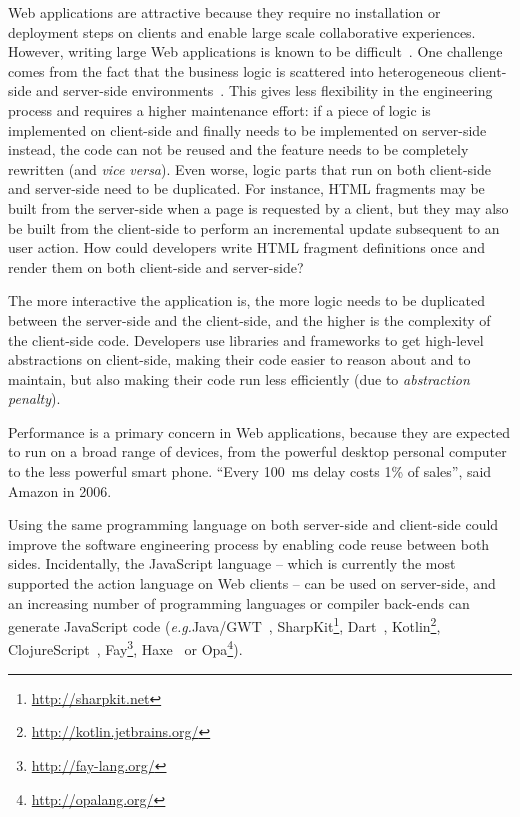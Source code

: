\documentclass[preprint]{sigplanconf}
\newcommand{\eg}{\emph{e.g.}}
\begin{document}
Web applications are attractive because they require no installation or deployment steps on clients and enable large
scale collaborative experiences. However, writing large Web applications is known to be
difficult~\cite{Mikkonen08_SpaghettiJs,Preciado05_RIAMethodologyNecessity}. One challenge comes from the fact
that the business logic is scattered into heterogeneous client-side and server-side
environments~\cite{Echeverria09_RIA,Kuuskeri09_PartitioningClientServer}. This gives less flexibility in the
engineering process and requires a higher maintenance effort: if a piece of logic is implemented on client-side and
finally needs to be implemented on server-side instead, the code can not be reused and the feature needs to be
completely rewritten (and \emph{vice versa}). Even worse, logic parts that run on both client-side and server-side
need to be duplicated. For instance, HTML fragments may be built from the server-side when a page is requested by a
client, but they may also be built from the client-side to perform an incremental update subsequent to an user
action. How could developers write HTML fragment definitions once and render them on both client-side and
server-side?

The more interactive the application is, the more logic needs to be duplicated between the server-side
and the client-side, and the higher is the complexity of the client-side code. Developers use libraries and
frameworks to get high-level abstractions on client-side, making their code easier to reason about and to maintain,
but also making their code run less efficiently (due to \emph{abstraction penalty}).

Performance is a primary concern in Web applications, because they are expected to run on a broad range of devices,
from the powerful desktop personal computer to the less powerful smart phone. “Every 100~ms delay costs 1\% of
sales”, said Amazon in 2006.

Using the same programming language on both server-side and client-side could improve the software engineering
process by enabling code reuse between both sides. Incidentally, the JavaScript language -- which is currently the
most supported the action language on Web clients -- can be used on server-side, and an increasing number of
programming languages or compiler back-ends can generate JavaScript code (\eg Java/GWT~\cite{Chaganti07_GWT},
SharpKit\footnote{\href{http://sharpkit.net}{http://sharpkit.net}}, Dart~\cite{Griffith11_Dart},
Kotlin\footnote{\href{http://kotlin.jetbrains.org/}{http://kotlin.jetbrains.org/}},
ClojureScript~\cite{McGranaghan11_ClojureScript}, Fay\footnote{\href{http://fay-lang.org/}{http://fay-lang.org/}},
Haxe~\cite{Cannasse08_HaXe} or Opa\footnote{\href{http://opalang.org/}{http://opalang.org/}}).
\end{document}
